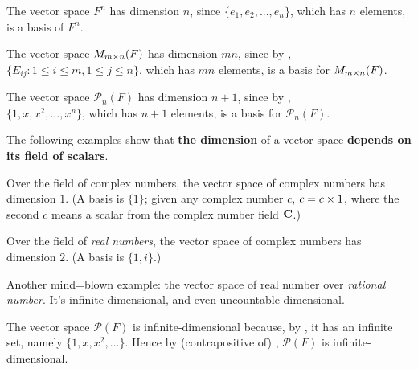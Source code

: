 \begin{example} \label{example 1.6.8}
The vector space \(F^n\) has dimension \(n\), since \(\{ e_1, e_2, ..., e_n \}\), which has \(n\) elements, is a basis of \(F^n\).
\end{example}

\begin{example} \label{example 1.6.9}
The vector space \(M_{m \times n}(F)\) has dimension \(mn\), since by , \(\{ E_{ij} : 1 \le i \le m, 1 \le j \le n \}\), which has \(mn\) elements, is a basis for \(M_{m \times n}(F)\).
\end{example}

\begin{example} \label{example 1.6.10}
The vector space \(\mathcal{P}_n(F)\) has dimension \(n + 1\), since by , \\
\(\{ 1, x, x^2, ..., x^n \}\), which has \(n + 1\) elements, is a basis for \(\mathcal{P}_n(F)\).
\end{example}

The following examples show that \textbf{the dimension} of a vector space \textbf{depends on its field of scalars}.

\begin{example} \label{example 1.6.11}
Over the field of complex numbers, the vector space of complex numbers has dimension \(1\).
(A basis is \(\{ 1 \}\); given any complex number \(c\), \(c = c \times 1\), where the second \(c\) means a scalar from the complex number field \(\mathbf{C}\).)
\end{example}

\begin{example} \label{example 1.6.12}
Over the field of \textit{real numbers}, the vector space of complex numbers has dimension \(2\).
(A basis is \(\{ 1, i \}\).)
\end{example}

\begin{remark} \label{remark 1.6.4}
Another mind=blown example: the vector space of real number over \emph{rational number}.
It's infinite dimensional, and even uncountable dimensional.
\end{remark}

\begin{example} \label{example 1.6.13}
The vector space \(\mathcal{P}(F)\) is infinite-dimensional because, by , it has an infinite \LID{} set, namely \(\{ 1, x, x^2, ... \}\).
Hence by (contrapositive of) , \(\mathcal{P}(F)\) is infinite-dimensional.
\end{example}

